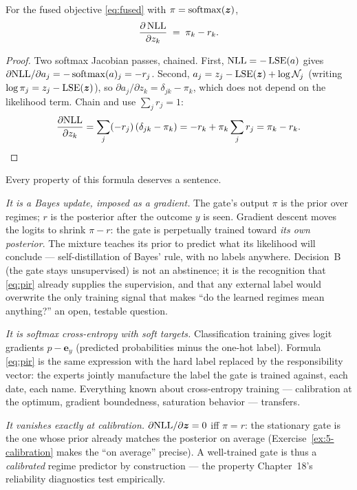 \begin{theorem}\label{thm:pir}
For the fused objective \eqref{eq:fused} with
$\pi = \operatorname{softmax}(\bm{z})$,
\begin{equation}\label{eq:pir}
  \frac{\partial\, \mathrm{NLL}}{\partial z_k} \;=\; \pi_k - r_k .
\end{equation}
\end{theorem}

\begin{proof}
Two softmax Jacobian passes, chained. First, $\mathrm{NLL} = -\operatorname{LSE}(a)$ gives
$\partial \mathrm{NLL} / \partial a_j = -\operatorname{softmax}(a)_j = -r_j$.
Second, $a_j = z_j - \operatorname{LSE}(\bm{z}) + \log \mathcal{N}_j$ (writing
$\log\pi_j = z_j - \operatorname{LSE}(\bm{z})$), so
$\partial a_j / \partial z_k = \delta_{jk} - \pi_k$, which does not
depend on the likelihood term. Chain and use $\sum_j r_j = 1$:
\[
  \frac{\partial \mathrm{NLL}}{\partial z_k}
  = \sum_j (-r_j)\,(\delta_{jk} - \pi_k)
  = -r_k + \pi_k \sum_j r_j
  = \pi_k - r_k. \qedhere
\]
\end{proof}

Every property of this formula deserves a sentence.

\emph{It is a Bayes update, imposed as a gradient.} The gate's output
$\pi$ is the prior over regimes; $r$ is the posterior after the outcome
$y$ is seen. Gradient descent moves the logits to shrink $\pi - r$: the
gate is perpetually trained toward \emph{its own posterior}. The
mixture teaches its prior to predict what its likelihood will conclude
--- self-distillation of Bayes' rule, with no labels anywhere.
Decision~B (the gate stays unsupervised) is not an abstinence; it is the
recognition that \eqref{eq:pir} already supplies the supervision, and
that any external label would overwrite the only training signal that
makes ``do the learned regimes mean anything?'' an open, testable
question.

\emph{It is softmax cross-entropy with soft targets.} Classification
training gives logit gradients $p - \bm{e}_{y}$ (predicted probabilities
minus the one-hot label). Formula \eqref{eq:pir} is the same expression
with the hard label replaced by the responsibility vector: the experts
jointly manufacture the label the gate is trained against, each date, each
name. Everything known about cross-entropy training --- calibration at
the optimum, gradient boundedness, saturation behavior --- transfers.

\emph{It vanishes exactly at calibration.} $\partial \mathrm{NLL} / \partial
\bm{z} = 0$ iff $\pi = r$: the stationary gate is the one whose prior
already matches the posterior on average
(Exercise~\ref{ex:5-calibration} makes the ``on average'' precise). A
well-trained gate is thus a \emph{calibrated} regime predictor by
construction --- the property Chapter~18's reliability diagnostics test
empirically.

